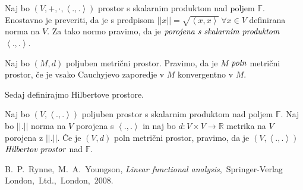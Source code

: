 \documentclass[mat2]{matdelo}
\newcommand{\R}{\mathbb{R}}
\newcommand{\F}{\mathbb{F}}
\newcommand{\abs}[1]{\ensuremath{\lvert #1 \rvert}}
\newcommand{\norm}[1]{\abs{\abs{#1}}}
\newcommand{\pojem}[1]{\ensuremath{\emph{#1}}}
\newcommand{\Sp}[2]{\ensuremath{\left<#1, #2\right>}}
\newcommand{\map}[3]{\ensuremath{{#1}:{#2}\rightarrow{#3}}}
\begin{document}
		\begin{opomba}
			\label{op:ScalProd}
			Naj bo $(V, +, \cdot, \Sp{.}{.})$ prostor s skalarnim produktom nad poljem $\F$. Enostavno je preveriti, da je s predpisom $\norm{x} = \sqrt{\Sp{x}{x}}~\forall x\in V$ definirana norma na $V$. Za tako normo pravimo, da je \pojem{porojena s skalarnim produktom} $\Sp{.}{.}$.
		\end{opomba}
		\begin{definicija}
			\label{def:PolnMP}
			Naj bo $(M, d)$ poljuben metrični prostor. Pravimo, da je $M$ \pojem{poln} metrični prostor, če je vsako Cauchyjevo zaporedje v $M$ konvergentno v $M$.
		\end{definicija}
		Sedaj definirajmo Hilbertove prostore.
		\begin{definicija}
			\label{def:Hilbert}
			Naj bo $(V, \Sp{.}{.})$ poljuben prostor s skalarnim produktom nad poljem $\F$. Naj bo $\norm{.}$ norma na $V$ porojena s $\Sp{.}{.}$ in naj bo $\map{d}{V\times V}{\R}$ metrika na $V$ porojena z $\norm{.}$. Če je $(V, d)$ poln metrični prostor, pravimo, da je $(V, \Sp{.}{.})$ \pojem{Hilbertov prostor} nad $\F$. 
		\end{definicija}
		
	\begin{thebibliography}{99}
		 B.~P.~Rynne,~M.~A.~Youngson, \emph{Linear functional analysis},~Springer-Verlag London,~Ltd.,~London,~2008.
	\end{thebibliography}
\end{document}
